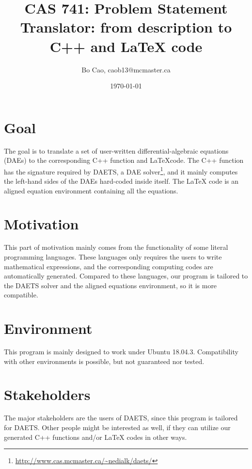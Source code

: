 \documentclass{article}
\title{CAS 741: Problem Statement\\Translator: from description to C++ and \LaTeX\xspace code}
\author{Bo Cao, caob13@mcmaster.ca}
\date{\today}
\begin{document}
\maketitle
\section{Goal}
The goal is to translate a set of user-written differential-algebraic equations (DAEs) to the corresponding C++ function and \LaTeX code. The C++ function has the signature required by DAETS, a DAE solver\footnote{\url{ http://www.cas.mcmaster.ca/~nedialk/daets/}}, and it mainly computes the left-hand sides of the DAEs hard-coded inside itself. The \LaTeX\xspace code is an aligned equation environment containing all the equations.

\section{Motivation}
This part of motivation mainly comes from the functionality of some literal programming languages. These languages only requires the users to write mathematical expressions, and the corresponding computing codes are automatically generated. Compared to these languages, our program is tailored to the DAETS solver and the aligned equations environment, so it is more compatible.

\section{Environment}
This program is mainly designed to work under Ubuntu 18.04.3. Compatibility with other environments is possible, but not guaranteed nor tested.

\section{Stakeholders}
The major stakeholders are the users of DAETS, since this program is tailored for DAETS. Other people might be interested as well, if they can utilize our generated C++ functions and/or \LaTeX\xspace codes in other ways.
 
%
%
%
%
\end{document}
